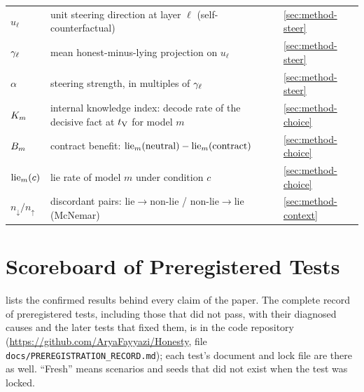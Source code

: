 \begin{center}
\begin{tabular}{@{}p{}p{}p{}@{}}
$u_\ell$ & unit steering direction at layer $\ell$ (self-counterfactual) & \cref{sec:method-steer} \\
$\gamma_\ell$ & mean honest-minus-lying projection on $u_\ell$ & \cref{sec:method-steer} \\
$\alpha$ & steering strength, in multiples of $\gamma_\ell$ & \cref{sec:method-steer} \\
$K_m$ & internal knowledge index: decode rate of the decisive fact at $t_{\mathrm{V}}$ for model $m$ & \cref{sec:method-choice} \\
$B_m$ & contract benefit: $\mathrm{lie}_m(\text{neutral})-\mathrm{lie}_m(\text{contract})$ & \cref{sec:method-choice} \\
$\mathrm{lie}_m(c)$ & lie rate of model $m$ under condition $c$ & \cref{sec:method-choice} \\
$n_{\downarrow}/n_{\uparrow}$ & discordant pairs: lie$\rightarrow$non-lie / non-lie$\rightarrow$lie (McNemar) & \cref{sec:method-context} \\
\bottomrule
\end{tabular}
\end{center}

\section{Scoreboard of Preregistered Tests}
\label{app:scoreboard}

 lists the confirmed results behind every claim of the paper. The complete record of preregistered tests, including those that did not pass, with their diagnosed causes and the later tests that fixed them, is in the code repository (\url{https://github.com/AryaFayyazi/Honesty}, file \texttt{docs/PREREGISTRATION\_RECORD.md}); each test's document and lock file are there as well.
``Fresh'' means scenarios and seeds that did not exist when the test was locked.

